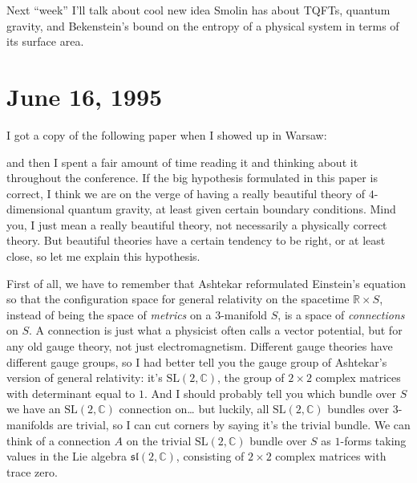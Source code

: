 \documentclass{article}
\def\tightlist{}
\renewcommand{\texttt}[1]{%
  \begingroup
  \ttfamily
  \begingroup\lccode`~=`/\lowercase{\endgroup\def~}{/\discretionary{}{}{}}%
  \begingroup\lccode`~=`[\lowercase{\endgroup\def~}{[\discretionary{}{}{}}%
  \begingroup\lccode`~=`.\lowercase{\endgroup\def~}{.\discretionary{}{}{}}%
  \catcode`/=\active\catcode`[=\active\catcode`.=\active
  \scantokens{#1\noexpand}%
  \endgroup
}
\begin{document}
Next ``week'' I'll talk about cool new idea Smolin has about TQFTs,
quantum gravity, and Bekenstein's bound on the entropy of a physical
system in terms of its surface area.



\hypertarget{week56}{%
\section{June 16, 1995}\label{week56}}

I got a copy of the following paper when I showed up in Warsaw:


and then I spent a fair amount of time reading it and thinking about it
throughout the conference. If the big hypothesis formulated in this
paper is correct, I think we are on the verge of having a really
beautiful theory of \(4\)-dimensional quantum gravity, at least given
certain boundary conditions. Mind you, I just mean a really beautiful
theory, not necessarily a physically correct theory. But beautiful
theories have a certain tendency to be right, or at least close, so let
me explain this hypothesis.

First of all, we have to remember that Ashtekar reformulated Einstein's
equation so that the configuration space for general relativity on the
spacetime \(\mathbb{R}\times S\), instead of being the space of
\emph{metrics} on a 3-manifold \(S\), is a space of \emph{connections}
on \(S\). A connection is just what a physicist often calls a vector
potential, but for any old gauge theory, not just electromagnetism.
Different gauge theories have different gauge groups, so I had better
tell you the gauge group of Ashtekar's version of general relativity:
it's \(\mathrm{SL}(2,\mathbb{C})\), the group of \(2\times2\) complex
matrices with determinant equal to \(1\). And I should probably tell you
which bundle over \(S\) we have an \(\mathrm{SL}(2,\mathbb{C})\)
connection on\ldots{} but luckily, all \(\mathrm{SL}(2,\mathbb{C})\)
bundles over 3-manifolds are trivial, so I can cut corners by saying
it's the trivial bundle. We can think of a connection \(A\) on the
trivial \(\mathrm{SL}(2,\mathbb{C})\) bundle over \(S\) as \(1\)-forms
taking values in the Lie algebra \(\mathfrak{sl}(2,\mathbb{C})\),
consisting of \(2\times2\) complex matrices with trace zero.
\end{document}

